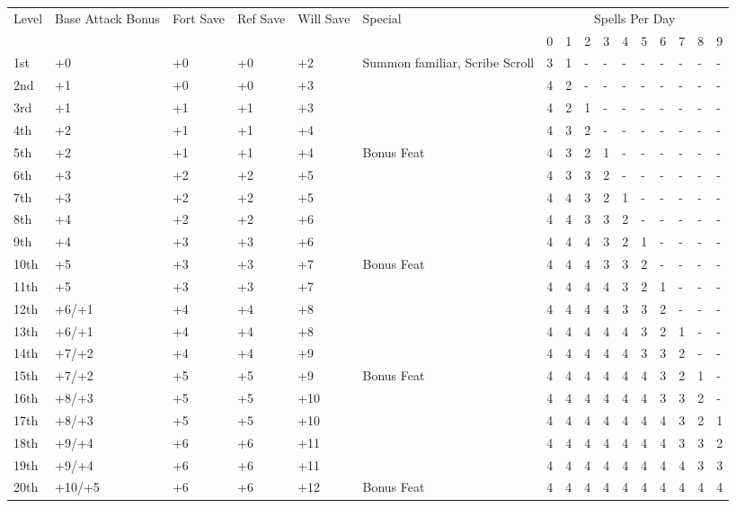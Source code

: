 \begin{table}[htb]
\begin{small}\begin{tabular}{lp{1.2cm}p{0.7cm}p{0.7cm}p{0.7cm}p{4.7cm}llllllllll}
Level  &Base Attack Bonus &Fort Save &Ref Save &Will Save &Special & \multicolumn{10}{c}{Spells Per Day}\\
       &       &   &   &    &                                &0 &1 &2 &3 &4 &5 &6 &7 &8 &9 \\
1st    &+0     &+0 &+0 &+2  & Summon familiar, Scribe Scroll &3 &1 &- &- &- &- &- &- &- &- \\
2nd    &+1     &+0 &+0 &+3  &                                &4 &2 &- &- &- &- &- &- &- &- \\
3rd    &+1     &+1 &+1 &+3  &                                &4 &2 &1 &- &- &- &- &- &- &- \\
4th    &+2     &+1 &+1 &+4  &                                &4 &3 &2 &- &- &- &- &- &- &- \\
5th    &+2     &+1 &+1 &+4  & Bonus Feat                     &4 &3 &2 &1 &- &- &- &- &- &- \\
6th    &+3     &+2 &+2 &+5  &                                &4 &3 &3 &2 &- &- &- &- &- &- \\
7th    &+3     &+2 &+2 &+5  &                                &4 &4 &3 &2 &1 &- &- &- &- &- \\
8th    &+4     &+2 &+2 &+6  &                                &4 &4 &3 &3 &2 &- &- &- &- &- \\
9th    &+4     &+3 &+3 &+6  &                                &4 &4 &4 &3 &2 &1 &- &- &- &- \\
10th   &+5     &+3 &+3 &+7  & Bonus Feat                     &4 &4 &4 &3 &3 &2 &- &- &- &- \\
11th   &+5     &+3 &+3 &+7  &                                &4 &4 &4 &4 &3 &2 &1 &- &- &- \\
12th   &+6/+1  &+4 &+4 &+8  &                                &4 &4 &4 &4 &3 &3 &2 &- &- &- \\
13th   &+6/+1  &+4 &+4 &+8  &                                &4 &4 &4 &4 &4 &3 &2 &1 &- &- \\
14th   &+7/+2  &+4 &+4 &+9  &                                &4 &4 &4 &4 &4 &3 &3 &2 &- &- \\
15th   &+7/+2  &+5 &+5 &+9  & Bonus Feat                     &4 &4 &4 &4 &4 &4 &3 &2 &1 &- \\
16th   &+8/+3  &+5 &+5 &+10 &                                &4 &4 &4 &4 &4 &4 &3 &3 &2 &- \\
17th   &+8/+3  &+5 &+5 &+10 &                                &4 &4 &4 &4 &4 &4 &4 &3 &2 &1 \\
18th   &+9/+4  &+6 &+6 &+11 &                                &4 &4 &4 &4 &4 &4 &4 &3 &3 &2 \\
19th   &+9/+4  &+6 &+6 &+11 &                                &4 &4 &4 &4 &4 &4 &4 &4 &3 &3 \\
20th   &+10/+5 &+6 &+6 &+12 & Bonus Feat                     &4 &4 &4 &4 &4 &4 &4 &4 &4 &4 \\
\end{tabular}
\end{small}
\end{table}

